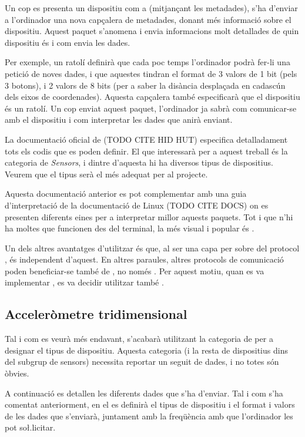 Un cop es presenta un dispositiu com a 
(mitjançant les metadades), s'ha d'enviar a l'ordinador una nova capçalera de
metadades, donant més informació sobre el dispositiu. Aquest paquet s'anomena
 i envia informacions molt detallades de
quin dispositiu és i com envia les dades.

Per exemple, un ratolí definirà que cada poc temps l'ordinador podrà fer-li
una petició de noves dades, i que aquestes tindran el format de 3 valors
de 1 bit (pels 3 botons), i 2 valors de 8 bits (per a saber la disància
desplaçada en cadascún dels eixos de coordenades). Aquesta capçalera també
especificarà que el dispositiu és un ratolí. Un cop enviat aquest paquet,
l'ordinador ja sabrà com comunicar-se amb el
dispositiu i com interpretar les dades que anirà enviant.

La documentació oficial de  (TODO CITE HID HUT) especifica
detalladament tots els codis que es poden definir. El que interessarà per a
aquest treball és la categoria de \textit{Sensors}, i dintre d'aquesta hi ha
diversos tipus de dispositius. Veurem que el tipus  serà
el més adequat per al projecte.

Aquesta documentació anterior es pot complementar amb una guia d'interpretació
de la documentació de Linux (TODO CITE DOCS) on es presenten diferents eines
per a interpretar millor aquests paquets. Tot i que n'hi ha moltes que
funcionen des del terminal, la més visual i popular és .

Un dels altres avantatges d'utilitzar  és que, al ser una capa per
sobre del protocol , és independent d'aquest. En altres paraules,
altres protocols de comunicació poden beneficiar-se també de , no
només . Per aquest motiu, quan es va implementar ,
es va decidir utilitzar també .

\subsection{Acceleròmetre tridimensional}

Tal i com es veurà més endavant, s'acabarà utilitzant la categoria de
 per a designar el tipus de dispositiu. Aquesta
categoria (i la resta de dispositius dins del subgrup de sensors) necessita
reportar un seguit de dades, i no totes són òbvies.

A continuació es detallen les diferents dades que s'ha d'enviar. Tal i com s'ha
comentat anteriorment, en el  es definirà
el tipus de dispositiu i el format i valors de les dades que s'enviarà, juntament
amb la freqüència amb que l'ordinador les pot so\l.licitar.

